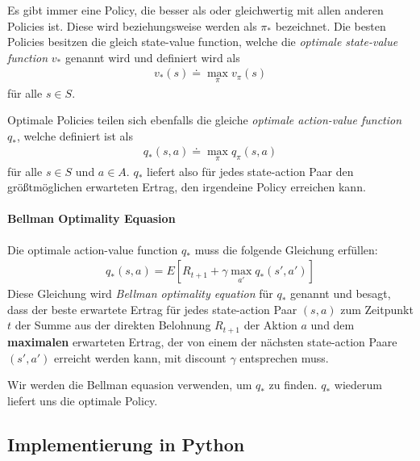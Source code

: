Es gibt immer eine Policy, die besser als oder gleichwertig mit allen anderen Policies ist. Diese wird beziehungsweise werden als $ \pi_* $ bezeichnet. Die besten Policies besitzen die gleich state-value function, welche die \textit{optimale state-value function} $ v_* $ genannt wird und definiert wird als
\begin{align}
    v_*(s) \doteq \max_\pi v_\pi(s)
\end{align}
für alle $ s \in S $.

Optimale Policies teilen sich ebenfalls die gleiche \textit{optimale action-value function} $ q_* $, welche definiert ist als
\begin{align}
    q_*(s, a) \doteq \max_\pi q_\pi(s, a)
\end{align}
für alle $ s \in S $ und $ a \in A $. $ q_* $ liefert also für jedes state-action Paar den größtmöglichen erwarteten Ertrag, den irgendeine Policy erreichen kann.

\paragraph{Bellman Optimality Equasion}
Die optimale action-value function $ q_* $ muss die folgende Gleichung erfüllen:
\begin{align}
    q_*(s, a) = E \left[R_{t + 1} + \gamma \max_{a'} q_*(s', a') \right]
\end{align}
Diese Gleichung wird \textit{Bellman optimality equation} für $ q_* $ genannt und besagt, dass der beste erwartete Ertrag für jedes state-action Paar $ (s, a) $ zum Zeitpunkt $ t $ der Summe aus der direkten Belohnung $ R_{t + 1} $ der Aktion $ a $ und dem \textbf{maximalen} erwarteten Ertrag, der von einem der nächsten state-action Paare $ (s', a') $ erreicht werden kann, mit discount $ \gamma $ entsprechen muss.

Wir werden die Bellman equasion verwenden, um $ q_* $ zu finden. $ q_* $ wiederum liefert uns die optimale Policy.

\subsection{Implementierung in Python}



